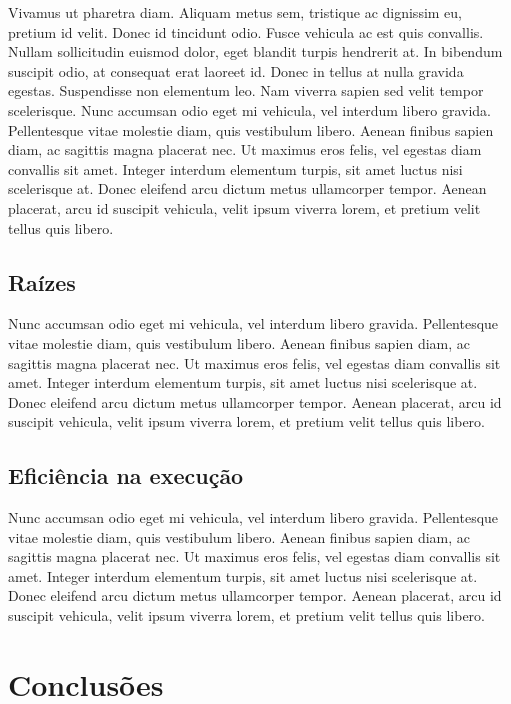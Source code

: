 \documentclass[a4paper, 12pt, openright, oneside]{article}
\begin{document}
Vivamus ut pharetra diam. Aliquam metus sem, tristique ac dignissim eu, pretium id velit. Donec id tincidunt odio. Fusce vehicula ac est quis convallis. Nullam sollicitudin euismod dolor, eget blandit turpis hendrerit at. In bibendum suscipit odio, at consequat erat laoreet id. Donec in tellus at nulla gravida egestas. Suspendisse non elementum leo. Nam viverra sapien sed velit tempor scelerisque. Nunc accumsan odio eget mi vehicula, vel interdum libero gravida. Pellentesque vitae molestie diam, quis vestibulum libero. Aenean finibus sapien diam, ac sagittis magna placerat nec. Ut maximus eros felis, vel egestas diam convallis sit amet. Integer interdum elementum turpis, sit amet luctus nisi scelerisque at. Donec eleifend arcu dictum metus ullamcorper tempor. Aenean placerat, arcu id suscipit vehicula, velit ipsum viverra lorem, et pretium velit tellus quis libero.

\subsection{Raízes}
Nunc accumsan odio eget mi vehicula, vel interdum libero gravida. Pellentesque vitae molestie diam, quis vestibulum libero. Aenean finibus sapien diam, ac sagittis magna placerat nec. Ut maximus eros felis, vel egestas diam convallis sit amet. Integer interdum elementum turpis, sit amet luctus nisi scelerisque at. Donec eleifend arcu dictum metus ullamcorper tempor. Aenean placerat, arcu id suscipit vehicula, velit ipsum viverra lorem, et pretium velit tellus quis libero.

\subsection{Eficiência na execução}
Nunc accumsan odio eget mi vehicula, vel interdum libero gravida. Pellentesque vitae molestie diam, quis vestibulum libero. Aenean finibus sapien diam, ac sagittis magna placerat nec. Ut maximus eros felis, vel egestas diam convallis sit amet. Integer interdum elementum turpis, sit amet luctus nisi scelerisque at. Donec eleifend arcu dictum metus ullamcorper tempor. Aenean placerat, arcu id suscipit vehicula, velit ipsum viverra lorem, et pretium velit tellus quis libero.

\newpage

\section{Conclusões}
\end{document}
